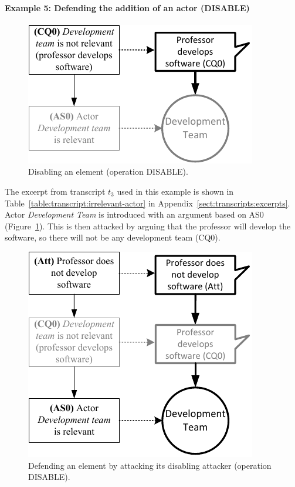\paragraph{Example 5: Defending the addition of an actor (\textsf{DISABLE)}}

\begin{figure}[t]
\centering
\includegraphics[]{img/reinstate1.pdf}
\caption{Disabling an element (operation \textsf{DISABLE)}.}
\label{fig:examples:relevant-actor}
\end{figure}

The excerpt from transcript $t_3$ used in this example is shown in Table~\ref{table:transcript:irrelevant-actor} in Appendix~\ref{sect:transcripts:excerpts}. Actor \emph{Development Team} is introduced with an argument based on AS0 (Figure~\ref{fig:examples:relevant-actor}). This is then attacked by arguing that the professor will develop the software, so there will not be any development team (CQ0). 

\begin{figure}[b]
\centering
\includegraphics[]{img/reinstate2.pdf}
\caption{Defending an element by attacking its disabling attacker (operation \textsf{DISABLE)}.}
\label{fig:examples:relevant-actor2}
\end{figure}

